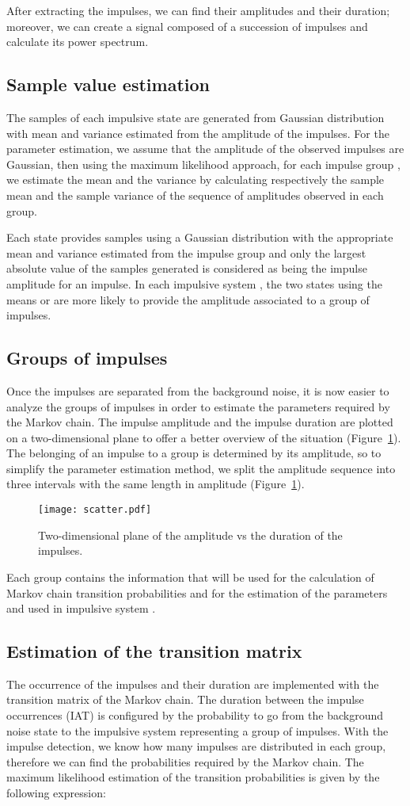 \documentclass[journal]{IEEEtran}
\begin{document}
After extracting the impulses, we can find their amplitudes and their duration; moreover, we can create a signal composed of a succession of impulses and calculate its power spectrum.
\subsection{Sample value estimation}
The samples of each impulsive state are generated from Gaussian distribution with mean and variance estimated from the amplitude of the impulses. For the parameter estimation, we assume that the amplitude of the observed impulses are Gaussian, then using the maximum likelihood approach, for each impulse group , we estimate the mean  and the variance  by calculating respectively the sample mean and the sample variance of the sequence of amplitudes observed in each group.\

Each state provides samples using a Gaussian distribution with the appropriate mean and variance estimated from the impulse group and only the largest absolute value of the samples generated is considered as being the impulse amplitude for an impulse. In each impulsive system , the two states using the means  or  are more likely to provide the amplitude associated to a group of impulses.
\subsection{Groups of impulses}
Once the impulses are separated from the background noise, it is now easier to analyze the groups of impulses in order to estimate the parameters required by the Markov chain. The impulse amplitude and the impulse duration are plotted on a two-dimensional plane to offer a better overview of the situation (Figure~\ref{scatter}). The belonging of an impulse to a group is determined by its amplitude, so to simplify the parameter estimation method, we split the amplitude sequence into three intervals with the same length in amplitude (Figure~\ref{scatter}).
\begin{figure}[h]
\begin{center}
    \texttt{[image: scatter.pdf]}
\end{center}
  \caption{Two-dimensional plane of the amplitude vs the duration of the impulses.}\label{scatter}
\end{figure}
Each group contains the information that will be used for the calculation of Markov chain transition probabilities and for the estimation of the parameters  and  used in impulsive system .
\subsection{Estimation of the transition matrix}
The occurrence of the impulses and their duration are implemented with the transition matrix of the Markov chain. The duration between the impulse occurrences (IAT) is configured by the probability to go from the background noise state to the impulsive system representing a group of impulses. With the impulse detection, we know how many impulses are distributed in each group, therefore we can find the probabilities required by the Markov chain. The maximum likelihood estimation of the transition probabilities is given by the following expression:
\end{document}
